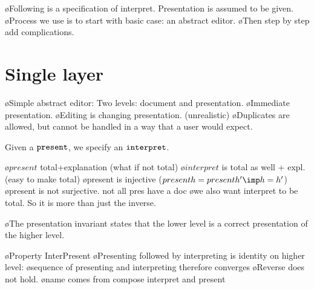 \bl
\o Following is a specification of interpret. Presentation is assumed to be given.
\o Process we use is to start with basic case: an abstract editor. 
\o Then step by step add complications.
\el



%																
%																
%																
\section{Single layer} \label{sect:singleSimple}

\bl
\o Simple abstract editor: Two levels: document and presentation.
\o Immediate presentation.
\o Editing is changing presentation. (unrealistic)
\o Duplicates are allowed, but cannot be handled in a way that a user would expect.
\el


Given a ${\tt present}$, we specify an ${\tt interpret}$.


\bl
\o $present$ total+explanation (what if not total)
\o $interpret$ is total as well + expl. (easy to make total)
\o present is injective ($present h = present h' \imp h = h'$)
\o present is not surjective. not all pres have a doc
\o we also want interpret to be total. So it is more than just the inverse. 
\el


\bl
\o The presentation invariant states that the lower level is a correct presentation of the higher level.
\el



\bl
\o Property {\sc InterPresent} 
\o Presenting followed by interpreting is identity on higher level: 
\o sequence of presenting and interpreting therefore converges
\o Reverse does not hold.
\o name comes from compose interpret and present
\el

